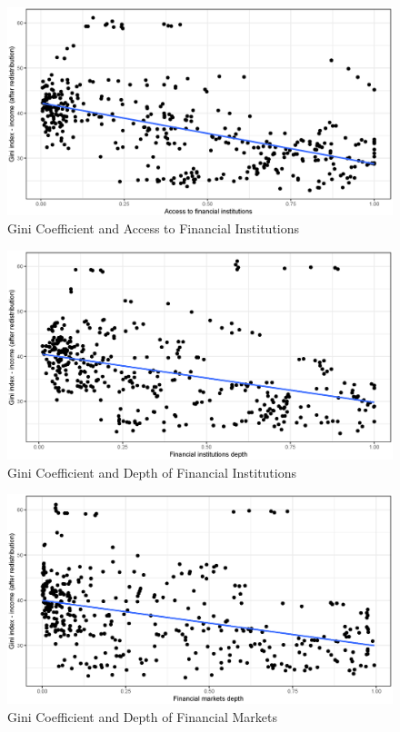 \documentclass[a4paper,11pt]{article}
\begin{document}
\begin{figure}
    \caption{Gini Coefficient and Access to Financial Institutions}
    \label{fig:ginifia}
\includegraphics[width=\textwidth, keepaspectratio]{figures/FIAGiniNet}
\end{figure}

\begin{figure}
    \caption{Gini Coefficient and Depth of Financial Institutions}
    \label{fig:ginifid}
\includegraphics[width=\textwidth, keepaspectratio]{figures/FIDGiniNet}
\end{figure}

\begin{figure}
    \caption{Gini Coefficient and Depth of Financial Markets}
    \label{fig:ginifmd}
\includegraphics[width=\textwidth, keepaspectratio]{figures/FMDGiniNet}
\end{figure}
\end{document}
